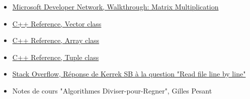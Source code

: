 \documentclass[10pt,a4paper]{article}
\begin{document}
\begin{itemize}
	\item \href{http://msdn.microsoft.com/en-us/library/hh873134.aspx}{Microsoft Developer Network, Walkthrough: Matrix Multiplication}
	\item \href{http://www.cplusplus.com/reference/vector/vector/}{C++ Reference, Vector class}
	\item \href{http://www.cplusplus.com/doc/tutorial/arrays/}{C++ Reference, Array class}
	\item \href{http://www.cplusplus.com/reference/tuple/tuple/}{C++ Reference, Tuple class}
	\item \href{http://stackoverflow.com/questions/7868936/c-read-file-line-by-line}{Stack Overflow, Réponse de Kerrek SB à la question "Read file line by line"}
	\item Notes de cours "Algorithmes Diviser-pour-Regner", Gilles Pesant
\end{itemize}
\end{document}
